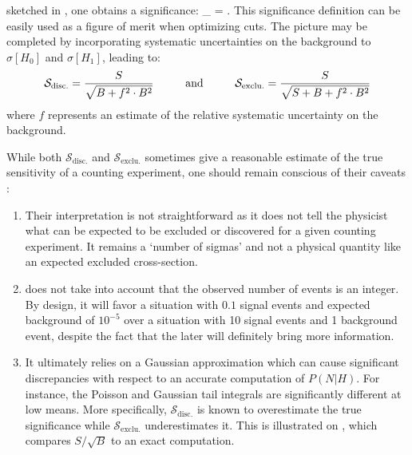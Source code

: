     sketched in , one obtains a significance:
    {
        _ = .
    }
    This significance definition can be easily used as a figure of merit when optimizing
    cuts. The picture may be completed by incorporating systematic uncertainties on the
    background to $\sigma[H_0]$ and $\sigma[H_1]$, leading to:
    \begin{equation}
       \mathcal{S}_\text{disc.} = \frac{S}{\sqrt{B+f^2 \cdot B^2}}
       \hspace*{1cm}
       \text{and}
       \hspace*{1cm}
       \mathcal{S}_\text{exclu.} = \frac{S}{\sqrt{S+B+f^2 \cdot B^2}}
       \label{FoM}
   \end{equation}
    where $f$ represents an estimate of the relative systematic uncertainty on the background.

    While both $\mathcal{S}_\text{disc.}$ and $\mathcal{S}_\text{exclu.}$ sometimes give a reasonable estimate of the true
    sensitivity of a counting experiment, one should remain conscious of their caveats \cite{Punzi}:

    \begin{enumerate}
      \item Their interpretation is not straightforward as it does not tell the
            physicist what can be expected to be excluded or discovered
            for a given counting experiment. It remains a `number of sigmas' and not a
            physical quantity like an expected excluded cross-section.
      \item {} does not take into account that
            the observed number of events is an integer. By design, it will favor a situation
            with $0.1$ signal events and expected background of $10^{-5}$ over a
            situation with 10 signal events and 1 background event, despite the fact that
            the later will definitely bring more information.
      \item It ultimately relies on a Gaussian approximation which can cause significant
            discrepancies with respect to an accurate computation of $P(N|H)$. For instance,
            the Poisson and Gaussian tail integrals are significantly different at low
            means. More specifically, $\mathcal{S}_\text{disc.}$ is known to overestimate
            the true significance while $\mathcal{S}_\text{exclu.}$ underestimates it.
            This is illustrated on , which
            compares $S/\sqrt{B}$ to an exact computation.
    \end{enumerate}

